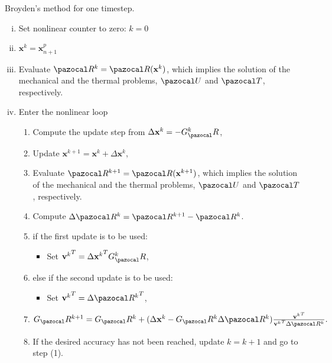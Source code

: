 \begin{framedbox}[htb]
  \caption{Broyden's method for one timestep.}
  \label{box:broydens_method}
  \begin{center}
    \begin{minipage}{0.9\textwidth}
    \begin{enumerate}[(i)]
    \item Set nonlinear counter to zero: \(k=0\)
    \item \(\mathbf x^k = \mathbf x_{n+1}^p\)
    \item Evaluate \(\pazocal R^k = \pazocal R(\mathbf x^k)\), which implies the solution of the mechanical and the thermal problems, \(\pazocal U\) and \(\pazocal T\), respectively.
    \item Enter the nonlinear loop
    \begin{enumerate}[(1)]
      \item Compute the update step from \(\Delta \mathbf x^k = - G^k_\pazocal R\),
      \item Update \(\mathbf x^{k+1} = \mathbf x^k + \Delta \mathbf x^k\),
      \item Evaluate \(\pazocal R^{k+1} = \pazocal R(\mathbf x^{k+1})\), which implies the solution of the mechanical and the thermal problems, \(\pazocal U\) and \(\pazocal T\), respectively.
      \item Compute \(\Delta \pazocal R^k = \pazocal R^{k+1} - \pazocal R^k\).
      \item if the first update is to be used:
      \begin{itemize}
        \item Set \({{\mathbf{v}}^k}^T = \Delta {\mathbf x^k}^T G^k_\pazocal R\),
      \end{itemize}
      \item else if the second update is to be used:
      \begin{itemize}
        \item Set \({{\mathbf{v}}^k}^T = \Delta {\pazocal R^k}^T\),
      \end{itemize}
      \item \(G_\pazocal R^{k+1} = G_\pazocal R^k + (\Delta \mathbf x^k - G_\pazocal R^k\Delta \pazocal R^k)\frac{{{\mathbf{v}}^k}^T}{{{\mathbf{v}}^k}^T\Delta \pazocal R^k}.\)
      \item If the desired accuracy has not been reached, update \(k=k+1\) and go to step (1).
    \end{enumerate}
    \end{enumerate}
    \end{minipage}
  \end{center}
\end{framedbox}


